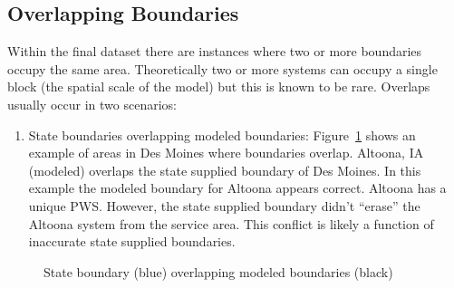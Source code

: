 \documentclass[12pt]{article}
\providecommand{\tightlist}{%
  \setlength{\itemsep}{0pt}\setlength{\parskip}{0pt}}
\begin{document}
\subsection{Overlapping Boundaries}\label{overlapping-boundaries}

Within the final dataset there are instances where two or more
boundaries occupy the same area. Theoretically two or more systems can
occupy a single block (the spatial scale of the model) but this is known
to be rare. Overlaps usually occur in two scenarios:

\begin{enumerate}
\def\labelenumi{\arabic{enumi}.}
\tightlist
\item
  State boundaries overlapping modeled boundaries:
  Figure~\ref{fig-overlap1} shows an example of areas in Des Moines
  where boundaries overlap. Altoona, IA (modeled) overlaps the state
  supplied boundary of Des Moines. In this example the modeled boundary
  for Altoona appears correct. Altoona has a unique PWS. However, the
  state supplied boundary didn't ``erase'' the Altoona system from the
  service area. This conflict is likely a function of inaccurate state
  supplied boundaries.
\end{enumerate}

\begin{figure}


\caption{\label{fig-overlap1}State boundary (blue) overlapping modeled
boundaries (black)}

\end{figure}%
\end{document}
